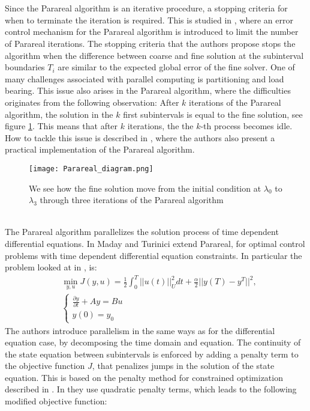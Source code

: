 \\
\\
Since the Parareal algorithm is an iterative procedure, a stopping criteria for when to terminate the iteration is required. This is studied in \cite{lepsa2010efficient}, where an error control mechanism for the Parareal algorithm is introduced to limit the number of Parareal iterations. The stopping criteria that the authors propose stops the algorithm when the difference between coarse and fine solution at the subinterval boundaries $T_i$ are similar to the expected global error of the fine solver. One of many challenges associated with parallel computing is partitioning and load bearing. This issue also arises in the Parareal algorithm, where the difficulties originates from the following observation: After $k$ iterations of the Parareal algorithm, the solution in  the $k$ first subintervals is equal to the fine solution, see figure \ref{Parareal_move_fig}. This means that after $k$ iterations, the the $k$-th process becomes idle. How to tackle this issue is described in \cite{aubanel2011scheduling}, where the authors also present a practical implementation of the Parareal algorithm. 
\\
\begin{figure}[h]
\centering
\texttt{[image: Parareal\_diagram.png]}
\caption{We see how the fine solution move from the initial condition at $\lambda_0$ to $\lambda_3$ through three iterations of the Parareal algorithm}
\label{Parareal_move_fig}
\end{figure}
\noindent
\\
The Parareal algorithm parallelizes the solution process of time dependent differential equations. In \cite{maday2002parareal} Maday and Turinici extend Parareal, for optimal control problems with time dependent differential equation constraints. In particular the problem looked at in \cite{maday2002parareal}, is: 
\begin{align*}
&\min_{y,u}J(y,u) = \frac{1}{2}\int_0^T||u(t)||_U^2dt + \frac{\alpha}{2}||y(T)-y^T||^2,\\
&\left\{
     \begin{array}{lr}
       	\frac{\partial y}{\partial t}+Ay = Bu\\
       	   y(0)=y_0
     \end{array}
   \right.
\end{align*}
The authors introduce parallelism in the same ways as for the differential equation case, by decomposing the time domain and equation. The continuity of the state equation between subintervals is enforced by adding a penalty term to the objective function $J$, that penalizes jumps in the solution of the state equation. This is based on the penalty method for constrained optimization described in \cite{nocedal2006numerical}. In \cite{maday2002parareal} they use quadratic penalty terms, which leads to the following modified objective function:
